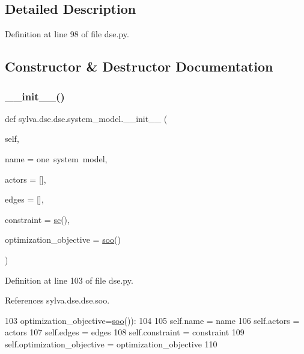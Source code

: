 \subsection{Detailed Description}


Definition at line 98 of file dse.\+py.



\subsection{Constructor \& Destructor Documentation}
\mbox{\label{classsylva_1_1dse_1_1dse_1_1system__model_a1d139488c7dc335da838c976cd35f748}} 
\subsubsection{\texorpdfstring{\+\_\+\+\_\+init\+\_\+\+\_\+()}{\_\_init\_\_()}}
{\footnotesize\ttfamily def sylva.\+dse.\+dse.\+system\+\_\+model.\+\_\+\+\_\+init\+\_\+\+\_\+ (\begin{DoxyParamCaption}\item[{}]{self,  }\item[{}]{name = {\ttfamily \textquotesingle{}one~system~model\textquotesingle{}},  }\item[{}]{actors = {\ttfamily \mbox{[}\mbox{]}},  }\item[{}]{edges = {\ttfamily \mbox{[}\mbox{]}},  }\item[{}]{constraint = {\ttfamily \hyperlink{namespacesylva_1_1dse_1_1dse_ac2d9fdcc3f7fd0bad1900fa0a813dff4}{sc}()},  }\item[{}]{optimization\+\_\+objective = {\ttfamily \hyperlink{namespacesylva_1_1dse_1_1dse_ab54fbae03bc2c432fecd4486e623af71}{soo}()} }\end{DoxyParamCaption})}



Definition at line 103 of file dse.\+py.



References sylva.\+dse.\+dse.\+soo.


\begin{DoxyCode}
103                  optimization\_objective=\hyperlink{namespacesylva_1_1dse_1_1dse_ab54fbae03bc2c432fecd4486e623af71}{soo}()):
104 
105         self.name = name
106         self.actors = actors
107         self.edges = edges
108         self.constraint = constraint
109         self.optimization\_objective = optimization\_objective
110 
\end{DoxyCode}


